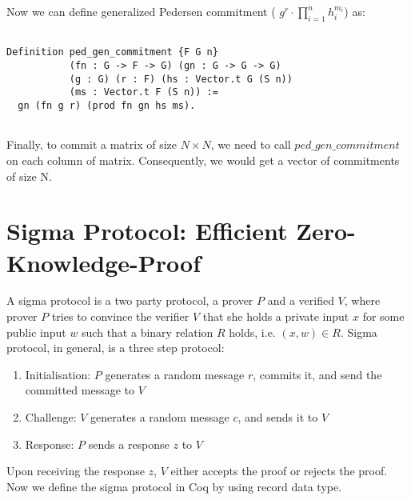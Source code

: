Now we can define  generalized Pedersen commitment ( $g^r \cdot  \prod_{i = 1}^n  h_{i}^{m_{i}}$) as:

\begin{verbatim}

Definition ped_gen_commitment {F G n}
           (fn : G -> F -> G) (gn : G -> G -> G)
           (g : G) (r : F) (hs : Vector.t G (S n))
           (ms : Vector.t F (S n)) :=
  gn (fn g r) (prod fn gn hs ms).
  
\end{verbatim}
  
 
Finally, to commit a matrix of size $N \times N$, we need to call 
$ped\_gen\_commitment$ on each column of matrix. Consequently, 
we  would get a vector of commitments of size N.

\section{Sigma Protocol: Efficient Zero-Knowledge-Proof}
\label{sec:sigma_coq}
A sigma protocol is a two party protocol, a prover $P$ and a verified $V$, where prover $P$ tries to convince the verifier $V$ that she 
holds a private input $x$ for some public input $w$ such that a binary relation $R$ holds, i.e. $(x, w) \in R$.  Sigma protocol, 
in general, is a three step protocol:
\begin{enumerate}
\item Initialisation: $P$ generates a random message $r$, commits it, and send the committed message to $V$
\item Challenge: $V$ generates a random message $c$, and sends it to $V$
\item Response: $P$ sends a response $z$ to $V$
\end{enumerate} 

\noindent
Upon receiving the response $z$, $V$ either accepts the proof or rejects the proof.  Now we define the sigma protocol in 
Coq by using record data type.

